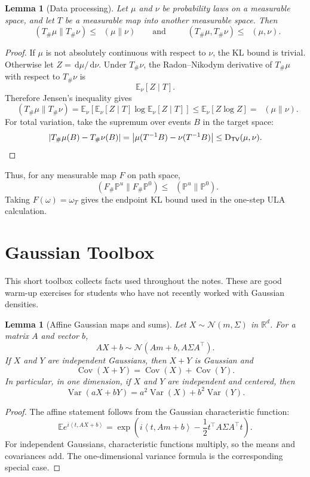 \documentclass[10pt,a4paper]{amsart}
\numberwithin{equation}{section}
\newtheorem{lemma}[theorem]{Lemma}
\DeclareMathOperator{\KL}{D_{\mathsf{KL}}}
\DeclareMathOperator{\TV}{D_{\mathsf{TV}}}
\DeclareMathOperator{\Cov}{Cov}
\newcommand{\R}{\mathbb{R}}
\newcommand{\E}{\mathbb{E}}
\newcommand{\Pp}{\mathbb{P}}
\newcommand{\dd}{\,\mathrm{d}}
\newcommand{\abs}[1]{\left\lvert #1 \right\rvert}
\newcommand{\ip}[2]{\left\langle #1,#2 \right\rangle}
\newcommand{\normal}[2]{\mathcal{N}\!\left(#1,#2\right)}
\begin{document}
\begin{lemma}[Data processing]\label{lem:data-processing}
Let $\mu$ and $\nu$ be probability laws on a measurable space, and let
$T$ be a measurable map into another measurable space.  Then
\[
    \KL(T_\#\mu\|T_\#\nu)\leq \KL(\mu\|\nu)
    \qquad\text{and}\qquad
    \TV(T_\#\mu,T_\#\nu)\leq \TV(\mu,\nu).
\]
\end{lemma}

\begin{proof}
If $\mu$ is not absolutely continuous with respect to $\nu$, the KL bound is
trivial.  Otherwise let $Z=\dd\mu/\dd\nu$.  Under $T_\#\nu$, the
Radon--Nikodym derivative of $T_\#\mu$ with respect to $T_\#\nu$ is
\[
    \E_\nu[Z\mid T].
\]
Therefore Jensen's inequality gives
\[
    \KL(T_\#\mu\|T_\#\nu)
    =
    \E_\nu\!\left[\E_\nu[Z\mid T]\log \E_\nu[Z\mid T]\right]
    \leq
    \E_\nu[Z\log Z]
    =
    \KL(\mu\|\nu).
\]
For total variation, take the supremum over events $B$ in the target space:
\[
    \abs{T_\#\mu(B)-T_\#\nu(B)}
    =
    \abs{\mu(T^{-1}B)-\nu(T^{-1}B)}
    \leq
    \TV(\mu,\nu). \qedhere
\]
\end{proof}

Thus, for any measurable map $F$ on path space,
\[
    \KL(F_\#\Pp^u\|F_\#\Pp^0)\leq \KL(\Pp^u\|\Pp^0).
\]
Taking $F(\omega)=\omega_T$ gives the endpoint KL bound used in the
one-step ULA calculation.

\section{Gaussian Toolbox}\label{app:gaussian-toolbox}

This short toolbox collects facts used throughout the notes.  These are good
warm-up exercises for students who have not recently worked with Gaussian
densities.

\begin{lemma}[Affine Gaussian maps and sums]\label{lem:gaussian-affine-sum}
Let $X\sim\normal{m}{\Sigma}$ in $\R^d$.  For a matrix $A$ and vector $b$,
\[
    AX+b\sim\normal{Am+b}{A\Sigma A^\top}.
\]
If $X$ and $Y$ are independent Gaussians, then $X+Y$ is Gaussian and
\[
    \Cov(X+Y)=\Cov(X)+\Cov(Y).
\]
In particular, in one dimension, if $X$ and $Y$ are independent and centered,
then
\[
    \operatorname{Var}(aX+bY)
    =
    a^2\operatorname{Var}(X)+b^2\operatorname{Var}(Y).
\]
\end{lemma}

\begin{proof}
The affine statement follows from the Gaussian characteristic function:
\[
    \E e^{i\ip{t}{AX+b}}
    =
    \exp\!\left(i\ip{t}{Am+b}-\frac12 t^\top A\Sigma A^\top t\right).
\]
For independent Gaussians, characteristic functions multiply, so the means and
covariances add.  The one-dimensional variance formula is the corresponding
special case.
\end{proof}
\end{document}

